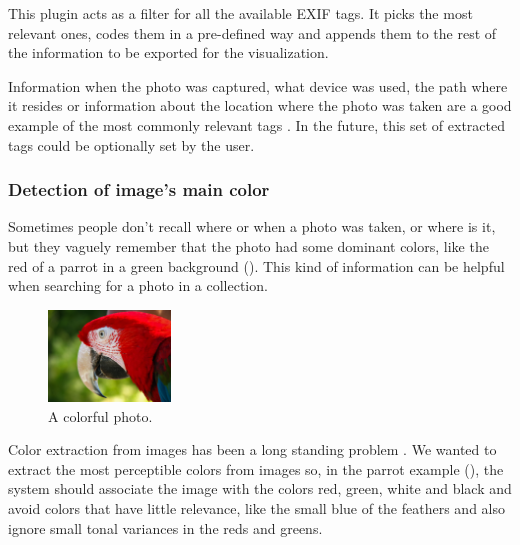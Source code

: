 This plugin acts as a filter for all the available \ac{EXIF} tags. It picks the most relevant ones, codes them in a pre-defined way and appends them to the rest of the information to be exported for the visualization.

Information when the photo was captured, what device was used, the path where it resides or information about the location where the photo was taken are a good example of the most commonly relevant tags . In the future, this set of extracted tags could be optionally set by the user.


\subsubsection{Detection of image’s main color}

Sometimes people don’t recall where or when a photo was taken, or where is it, but they vaguely remember that the photo had some dominant colors, like the red of a parrot in a green background (). This kind of information can be helpful when searching for a photo in a collection.

\begin{figure}
	\vspace{-20pt}
	\begin{center}
		\includegraphics[width=0.29\textwidth]{Figures/parrot}
	\end{center}
	\vspace{-20pt}
	\caption{A colorful photo.}
	\vspace{-5pt}
	\label{fig:parrot}
\end{figure}

Color extraction from images has been a long standing problem \cite{Wan:2011bg,Strong:2009p413,Gabbouj:2009en,Girgensohn:2009:MOP:1502650.1502711,Zaheer:2010p3735,Datta:2008p1604,Chang:2007bt}. We wanted to extract the most perceptible colors from images so, in the parrot example (), the system should associate the image with the colors red, green, white and black and avoid colors that have little relevance, like the small blue of  the feathers and also ignore small tonal variances in the reds and greens.

